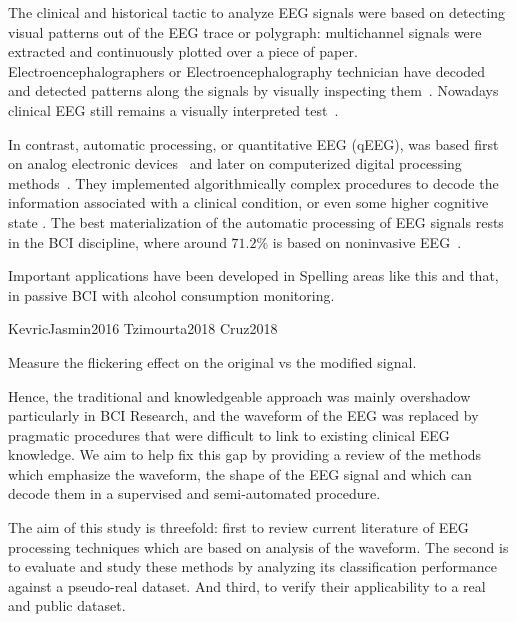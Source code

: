 \documentclass[brainsci,article,submit,moreauthors,pdftex,10pt,a4paper]{mdpi}
\begin{document}
The clinical and historical tactic to analyze EEG signals were based on detecting visual patterns out of the EEG trace or polygraph\citep{Hartman2005}: multichannel signals were extracted and continuously plotted over a piece of paper. Electroencephalographers or Electroencephalography technician have decoded and detected patterns along the signals by visually inspecting them~\citep{Schomer2010}.   Nowadays clinical EEG still remains a visually interpreted test~\citep{Hartman2005}.

In contrast, automatic processing, or quantitative EEG (qEEG), was based first on analog electronic devices~\citep{Jestico1977} and later on computerized digital processing methods~\citep{Jansen1991}.  They implemented algorithmically complex procedures to decode the information associated with a clinical condition, or even some higher cognitive state \citep{Yuste2017}.  The best materialization of the automatic processing of EEG signals rests in the BCI discipline, where around $71.2\%$ is based on noninvasive EEG~\citep{Guger2017}.  


Important applications have been developed in Spelling areas like this and that, in passive BCI with alcohol consumption monitoring.

KevricJasmin2016
Tzimourta2018
Cruz2018

Measure the flickering effect on the original vs the modified signal.



Hence, the traditional and knowledgeable approach was mainly overshadow particularly in BCI Research, and the waveform of the EEG was replaced by pragmatic procedures that were difficult to link to existing clinical EEG knowledge.  We aim to help fix this gap by providing a review of the methods which emphasize the waveform, the shape of the EEG signal and which can decode them in a supervised and semi-automated procedure.

The aim of this study is threefold: first to review current literature of EEG processing techniques which are based on analysis of the waveform.  The second is to evaluate and study these methods by analyzing its classification performance against a pseudo-real dataset. And third, to verify their applicability to a real and public dataset.  

\end{document}
